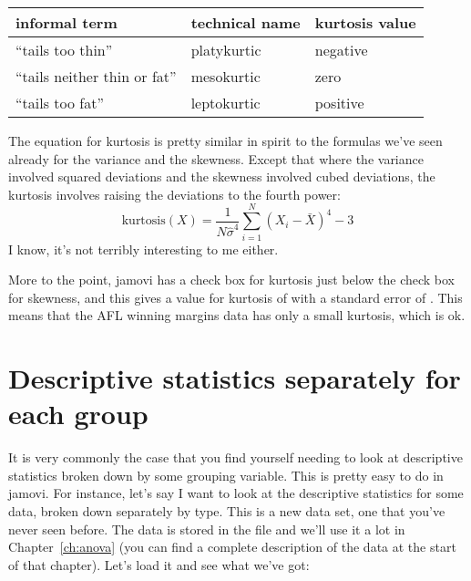\begin{center}
\begin{tabular}{lll}
informal term & technical name & kurtosis value \\ \hline
``tails too thin'' & platykurtic & negative \\
``tails neither thin or fat'' & mesokurtic & zero \\
``tails too fat'' & leptokurtic & positive 
\end{tabular}
\end{center}

\vspace{0.5cm}
\begin{mdframed}[style=MyFrame,nobreak=true]
The equation for kurtosis is pretty similar in spirit to the formulas we've seen already for the variance and the skewness. Except that where the variance involved squared deviations and the skewness involved cubed deviations, the kurtosis involves raising the deviations to the fourth power:
$$
\mbox{kurtosis}(X) = \frac{1}{N \hat\sigma^4} \sum_{i=1}^N \left( X_i - \bar{X} \right)^4  - 3
$$
I know, it's not terribly interesting to me either. 
\end{mdframed}

More to the point, jamovi has a check box for kurtosis just below the check box for skewness, and this gives a value for kurtosis of  with a standard error of . This means that the AFL winning margins data has only a small kurtosis, which is ok.


\section{Descriptive statistics separately for each group~\label{sec:groupdescriptives}}

It is very commonly the case that you find yourself needing to look at descriptive statistics broken down by some grouping variable. This is pretty easy to do in jamovi. For instance, let's  say I want to look at the descriptive statistics for some  data, broken down separately by  type. This is a new data set, one that you've never seen before. The data is stored in the  file and we'll use it a lot in Chapter~\ref{ch:anova} (you can find a complete description of the data at the start of that chapter). Let's load it and see what we've got:


